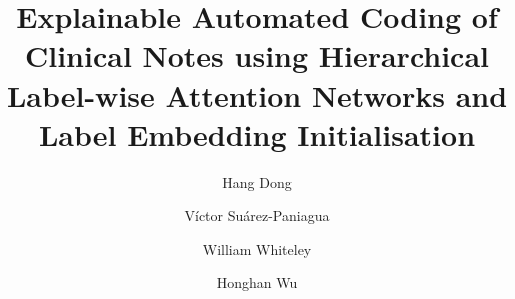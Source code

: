 \documentclass[final,5p,times,twocolumn]{elsarticle}
\begin{document}
\begin{frontmatter}





\title{Explainable Automated Coding of Clinical Notes using Hierarchical Label-wise Attention Networks and Label Embedding Initialisation}

\author[uoe,hdr]{Hang Dong}
\author[uoe,hdr]{V\'{i}ctor Su\'{a}rez-Paniagua}
\author[ccbs,hdr]{William Whiteley}
\author[ucl,hdr]{Honghan Wu}

\address[uoe]{Centre for Medical Informatics, Usher Institute of Population Health Sciences and Informatics, University of Edinburgh, Edinburgh, United Kingdom}
\address[ccbs]{Centre for Clinical Brain Sciences, University of Edinburgh}
\address[ucl]{Institute of Health Informatics, University College London, London, United Kingdom}
\address[hdr]{Health Data Research UK, London, United Kingdom}


\end{frontmatter}
\end{document}
